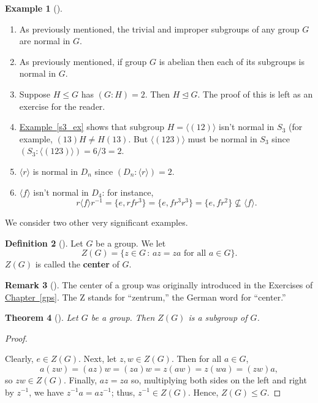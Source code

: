 \documentclass[10pt,]{book}
\newcommand{\terminology}[1]{\textbf{#1}}
\theoremstyle{plain}
\newtheorem{theorem}{Theorem}[section]
\theoremstyle{definition}
\newtheorem{definition}[theorem]{Definition}
\theoremstyle{definition}
\newtheorem{remark}[theorem]{Remark}
\theoremstyle{definition}
\newtheorem{example}[theorem]{Example}
\theoremstyle{definition}
\numberwithin{equation}{section}
\begin{document}
\begin{example}[]\label{example-78}
\leavevmode%
\begin{enumerate}
\item\hypertarget{li-480}{}As previously mentioned, the trivial and improper subgroups of any group \(G\) are normal in \(G\).%
\item\hypertarget{li-481}{}As previously mentioned, if group \(G\) is abelian then each of its subgroups is normal in \(G\).%
\item\hypertarget{li-482}{}Suppose \(H\leq G\) has \((G:H)=2\).  Then \(H \unlhd G\). The proof of this is left as an exercise for the reader.%
\item\hypertarget{li-483}{}\hyperref[s3_ex]{Example~\ref{s3_ex}} shows that subgroup \(H=\langle (12)\rangle\) isn't normal in \(S_3\) (for example, \((13)H\neq H(13)\).  But \(\langle (123)\rangle\) must be normal in \(S_3\) since \((S_3:\langle (123)\rangle )=6/3=2.\)%
\item\hypertarget{li-484}{}\(\langle r\rangle\) is normal in \(D_n\) since \((D_n:\langle r\rangle )=2\).%
\item\hypertarget{li-485}{}\(\langle f\rangle\) isn't normal in \(D_4\): for instance,%
\begin{equation*}
r\langle f\rangle r^{-1}=\{e,rfr^3\}=\{e, fr^3r^3\}=\{e,fr^2\}\not\subseteq
\langle f\rangle .
\end{equation*}
%
\end{enumerate}
\end{example}
We consider two other very significant examples.%
\begin{definition}[{}]\label{definition-64}
Let \(G\) be a group. We let%
\begin{equation*}
Z(G)=\{z\in G\,:\, az=za \mbox{ for all } a\in
G\}.
\end{equation*}
\(Z(G)\) is called the \terminology{center} of \(G\).%
\end{definition}
\begin{remark}[]\label{remark-39}
The center of a group was originally introduced in the Exercises of \hyperref[gps]{Chapter~\ref{gps}}. The Z stands for ``zentrum,'' the German word for ``center.''%
\end{remark}
\begin{theorem}[{}]\label{theorem-51}
Let \(G\) be a group. Then \(Z(G)\) is a subgroup of \(G\).%
\end{theorem}
\begin{proof}\hypertarget{proof-43}{}
Clearly, \(e\in Z(G)\). Next, let \(z,w\in Z(G)\). Then for all \(a \in G\),%
\begin{equation*}
a(zw)=(az)w=(za)w=z(aw)=z(wa)=(zw)a,
\end{equation*}
so \(zw\in Z(G)\). Finally, \(az=za\) so, multiplying both sides on the left and right by \(z^{-1}\), we have \(z^{-1}a=az^{-1}\); thus, \(z^{-1}\in Z(G)\). Hence, \(Z(G)\leq G\).%
\end{proof}
\end{document}
